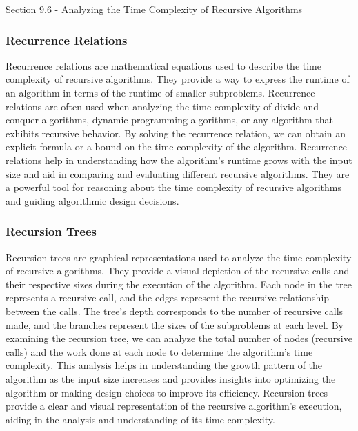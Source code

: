 \begin{notes}{Section 9.6 - Analyzing the Time Complexity of Recursive Algorithms}
    \subsubsection*{Recurrence Relations}

    Recurrence relations are mathematical equations used to describe the time complexity of recursive algorithms. They provide a way to express the runtime of an algorithm in terms of the runtime of smaller subproblems. Recurrence relations are often used when analyzing the time complexity of divide-and-conquer algorithms, dynamic programming algorithms, or any algorithm that exhibits recursive behavior. By solving the recurrence relation, we can obtain an explicit formula 
    or a bound on the time complexity of the algorithm. Recurrence relations help in understanding how the algorithm's runtime grows with the input size and aid in comparing and evaluating different recursive algorithms. They are a powerful tool for reasoning about the time complexity of recursive algorithms and guiding algorithmic design decisions.
    
    \subsubsection*{Recursion Trees}
    
    Recursion trees are graphical representations used to analyze the time complexity of recursive algorithms. They provide a visual depiction of the recursive calls and their respective sizes during the execution of the algorithm. Each node in the tree represents a recursive call, and the edges represent the recursive relationship between the calls. The tree's depth corresponds to the number of recursive calls made, and the branches represent the sizes of the subproblems at 
    each level. By examining the recursion tree, we can analyze the total number of nodes (recursive calls) and the work done at each node to determine the algorithm's time complexity. This analysis helps in understanding the growth pattern of the algorithm as the input size increases and provides insights into optimizing the algorithm or making design choices to improve its efficiency. Recursion trees provide a clear and visual representation of the recursive algorithm's 
    execution, aiding in the analysis and understanding of its time complexity.
\end{notes}


